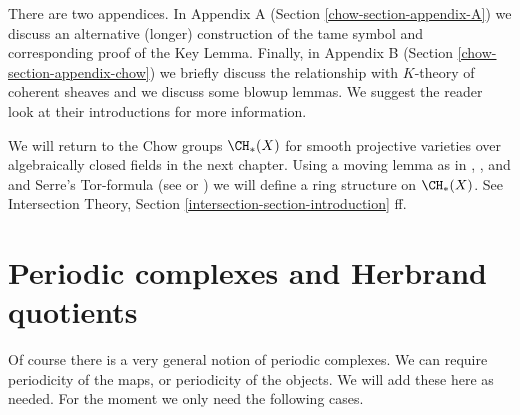 \medskip\noindent
There are two appendices. In Appendix A (Section \ref{chow-section-appendix-A})
we discuss an alternative (longer) construction of the
tame symbol and corresponding proof of the Key Lemma.
Finally, in Appendix B (Section \ref{chow-section-appendix-chow})
we briefly discuss the relationship with $K$-theory of coherent
sheaves and we discuss some blowup lemmas.
We suggest the reader look at their introductions for
more information.

\medskip\noindent
We will return to the Chow groups $\CH_*(X)$ for smooth projective varieties
over algebraically closed fields in the next chapter. Using a moving
lemma as in \cite{Samuel}, \cite{ChevalleyI}, and \cite{ChevalleyII}
and Serre's Tor-formula
(see \cite{Serre_local_algebra} or \cite{Serre_algebre_locale})
we will define a ring structure on $\CH_*(X)$. See
Intersection Theory, Section \ref{intersection-section-introduction} ff.

\section{Periodic complexes and Herbrand quotients}
\label{chow-section-periodic-complexes}
Of course there is a very general notion of periodic complexes.
We can require periodicity of the maps, or periodicity of the objects.
We will add these here as needed. For the moment we only need
the following cases.

